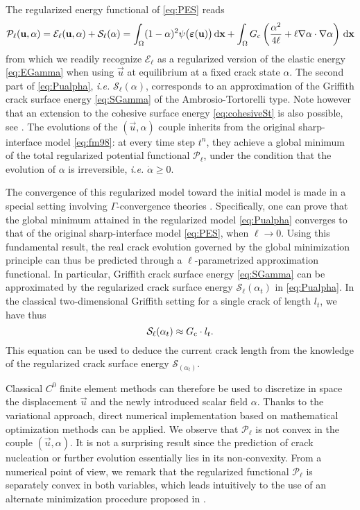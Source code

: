 The regularized energy functional of \eqref{eq:PES} reads
\begin{equation} \label{eq:Pualpha}
\mathcal{P}_\ell(\vec{u},\alpha)=\mathcal{E}_\ell(\vec{u},\alpha)+\mathcal{S}_\ell(\alpha)=\int_\Omega(1-\alpha)^2\psi\bigl(\eps(\vec{u})\bigr)\dx+\int_\Omega\gc\left(\frac{\alpha^2}{4\ell}+\ell\nabla\alpha\cdot\nabla\alpha\right)\dx
\end{equation}
from which we readily recognize $\mathcal{E}_\ell$ as a regularized version of the elastic energy \eqref{eq:EGamma} when using $\vec{u}$ at equilibrium at a fixed crack state $\alpha$. The second part of \eqref{eq:Pualpha}, \emph{i.e.} $\mathcal{S}_\ell(\alpha)$, corresponds to an approximation of the Griffith crack surface energy \eqref{eq:SGamma} of the Ambrosio-Tortorelli type. Note however that an extension to the cohesive surface energy \eqref{eq:cohesiveSt} is also possible, see \cite{ContiFocardiIurlano:2015}. The evolutions of the $(\vec{u},\alpha)$ couple inherits from the original sharp-interface model \eqref{eq:fm98}: at every time step $t^n$, they achieve a global minimum of the total regularized potential functional $\mathcal{P}_\ell$, under the condition that the evolution of $\alpha$ is irreversible, \emph{i.e.} $\dot{\alpha}\geq 0$.

The convergence of this regularized model toward the initial model is made in a special setting involving $\Gamma$-convergence theories \cite{Braides:2002}. Specifically, one can prove that the global minimum attained in the regularized model \eqref{eq:Pualpha} converges to that of the original sharp-interface model \eqref{eq:PES}, when $\ell\to 0$. Using this fundamental result, the real crack evolution governed by the global minimization principle can thus be predicted through a $\ell$-parametrized approximation functional. In particular, Griffith crack surface energy \eqref{eq:SGamma} can be approximated by the regularized crack surface energy $\mathcal{S}_\ell(\alpha_t)$ in \eqref{eq:Pualpha}. In the classical two-dimensional Griffith setting for a single crack of length $l_t$, we have thus
\begin{equation} \label{eq:Selllt}
\mathcal{S}_\ell(\alpha_t)\approx G_\mathrm{c}\cdot l_t.
\end{equation}
This equation can be used to deduce the current crack length from the knowledge of the regularized crack surface energy $\mathcal{S}_(\alpha_t)$.

Classical $C^0$ finite element methods can therefore be used to discretize in space the displacement $\vec{u}$ and the newly introduced scalar field $\alpha$. Thanks to the variational approach, direct numerical implementation based on mathematical optimization methods can be applied. We observe that $\mathcal{P}_\ell$ is not convex in the couple $(\vec{u},\alpha)$. It is not a surprising result since the prediction of crack nucleation or further evolution essentially lies in its non-convexity. From a numerical point of view, we remark that the regularized functional $\mathcal{P}_\ell$ is separately convex in both variables, which leads intuitively to the use of an alternate minimization procedure proposed in \cite{BourdinFrancfortMarigo:2000}.

